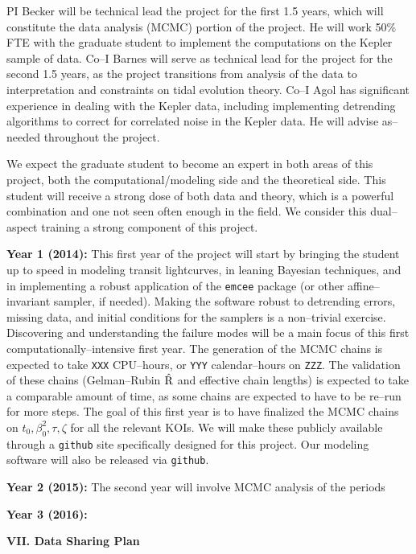PI Becker will be technical lead the project for the first 1.5 years,
which will constitute the data analysis (MCMC) portion of the project.
He will work 50\% FTE with the graduate student to implement the
computations on the Kepler sample of data.  Co--I Barnes will serve as
technical lead for the project for the second 1.5 years, as the
project transitions from analysis of the data to interpretation and
constraints on tidal evolution theory.  Co--I Agol has significant
experience in dealing with the Kepler data, including implementing
detrending algorithms to correct for correlated noise in the Kepler
data.  He will advise as--needed throughout the project.

We expect the graduate student to become an expert in both areas of
this project, both the computational/modeling side and the theoretical
side.  This student will receive a strong dose of both data and
theory, which is a powerful combination and one not seen often enough
in the field.  We consider this dual--aspect training a strong
component of this project.

{\bf Year 1 (2014):} This first year of the project will start by
bringing the student up to speed in modeling transit lightcurves, in
leaning Bayesian techniques, and in implementing a robust application
of the {\tt emcee} package (or other affine--invariant sampler, if
needed).  Making the software robust to detrending errors, missing
data, and initial conditions for the samplers is a non--trivial
exercise.  Discovering and understanding the failure modes will be a
main focus of this first computationally--intensive first year.  The
generation of the MCMC chains is expected to take {\tt XXX}
CPU--hours, or {\tt YYY} calendar--hours on {\tt ZZZ}. The validation
of these chains (Gelman--Rubin $\hat{\rm R}$ and effective chain
lengths) is expected to take a comparable amount of time, as some
chains are expected to have to be re--run for more steps.  The goal of
this first year is to have finalized the MCMC chains on $t_0,
\beta_0^2, \tau, \zeta$ for all the relevant KOIs.  We will make these
publicly available through a {\tt github} site specifically designed
for this project.  Our modeling software will also be released via
{\tt github}.

{\bf Year 2 (2015):} The second year will involve MCMC analysis of the
periods

{\bf Year 3 (2016):} 


\bigskip
\centerline{\bf VII. Data Sharing Plan}
\smallskip

